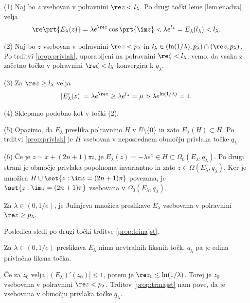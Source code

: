 \begin{dokaz}
    (1) Naj bo \(z\) vsebovan v polravnini \(\re z < l_\lambda\). Po drugi točki leme \ref{lem:enadva} velja
    \[\re \prt{E_\lambda (z)} = \lambda e^{\re z} \cos \prt{\im z} < \lambda e^{l_\lambda} = E_\lambda (l_\lambda) < l_\lambda.\]

    (2) Naj bo \(z\) vsebovan v polravnini \(\re z < p_\lambda\) in \(l_\lambda \in (\ln (1 / \lambda), p_\lambda) \cap (\re z, p_\lambda)\). Po trditvi \ref{prop:privlak}, uporabljeni na polravnini \(\re \zeta < l_\lambda\), vemo, da vsaka z začetno točko v polravnini \(\re \zeta < l_\lambda\) konvergira k \(q_\lambda\).

    (3) Za \(\re z \geq l_\lambda\) velja
    \[|E_\lambda' (z)| = \lambda e^{\re z} \geq \lambda e^{l_\lambda} = \mu > \lambda e^{\ln (1 / \lambda)} = 1.\]

    (4) Sklepamo podobno kot v točki (2).

    (5) Opazimo, da \(E_\lambda\) preslika polravnino \(H\) v \(\DD \setminus \{0\}\) in zato \(E_\lambda (H) \subset H\). Po trditvi \ref{prop:privlak} je \(H\) vsebovan v neposrednem območju privlaka točke \(q_\lambda\).

    (6) Če je \(z = x + (2n + 1) \pi i\), je \(E_\lambda (z) = - \lambda e^x \in H \subset \Omega_0 (E_\lambda, q_\lambda)\). Po drugi strani je območje privlaka popolnoma invariantno in zato \(z \in \Omega (E_\lambda, q_\lambda)\). Ker je množica \(H \cup \set{z : \im z = (2n + 1) \pi}\) povezana, je \(\set{z : \im z = (2n + 1) \pi}\) vsebovana v \(\Omega_0 (E_\lambda, q_\lambda)\).
\end{dokaz}

\begin{posledica} \label{cor:jul-e}
    Za \(\lambda \in (0, 1/e)\), je Juliajeva množica preslikave \(E_\lambda\) vsebovana v polravnini \(\re z \geq p_\lambda\).
\end{posledica}

\begin{dokaz}
    Posledica sledi po drugi točki trditve \ref{prop:trinajst}.
\end{dokaz}

\begin{posledica}
    Za \(\lambda \in (0, 1/e)\) preslikava \(E_\lambda\) nima nevtralnih fiksnih točk, \(q_\lambda\) pa je edina privlačna fiksna točka.
\end{posledica}

\begin{dokaz}
    Če za \(z_0\) velja \(|(E_\lambda)' (z_0)| \leq 1\), potem je \(\re z_0 \leq \ln (1 / \lambda)\). Torej je \(z_0\) vsebovana v polravnini \(\re z < p_\lambda\). Trditev \ref{prop:trinajst} nam pove, da je vsebovana v območju privlaka točke \(q_\lambda\).
\end{dokaz}

